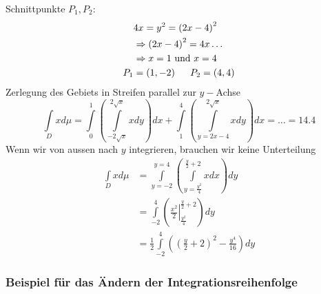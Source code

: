 \begin{enumerate}
Schnittpunkte $P_1,P_2$:
\begin{align*}
&4x=y^2=\left( 2x-4\right)^2\\
&\Rightarrow\left( 2x-4\right)^2=4x\dots\\
&\Rightarrow x=1 \text{ und } x=4\\
P_1&=\left(1,-2\right)\hspace{5mm}P_2=\left(4,4\right)
\end{align*}
Zerlegung des Gebiets in Streifen parallel zur $y-$Achse
\[\int\limits_D {xd\mu  = \int\limits_0^1 {\left( {\int\limits_{ - 2\sqrt x }^{2\sqrt x } {xdy} } \right)dx} }  + \int\limits_1^4 {\left( {\int\limits_{y = 2x - 4}^{2\sqrt x } {xdy} } \right)} dx =  \ldots  = 14.4\]
Wenn wir von aussen nach $y$ integrieren, brauchen wir keine Unterteilung
\begin{align*}
\int\limits_D xd\mu  &=\int\limits_{y =  - 2}^{y = 4} {\left( {\int\limits_{y = \frac{{{y^2}}}{4}}^{\frac{y}{2} + 2} {xdx} }\right)dy} \\
 &=\int\limits_{ - 2}^4 {\left( {\left. {\frac{{{x^2}}}{2}} \right|_{\frac{{{y^2}}}{4}}^{\frac{y}{2} + 2}} \right)dy}\\
&=\frac{1}{2}\int\limits_{ - 2}^4 {\left( {{{\left( {\frac{y}{2} + 2} \right)}^2} - \frac{{{y^4}}}{{16}}} \right)dy}
\end{align*}
\end{enumerate}

\subsubsection*{Beispiel für das Ändern der Integrationsreihenfolge}
